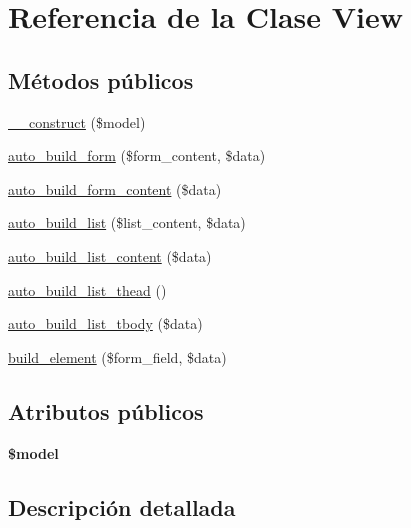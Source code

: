 \hypertarget{class_view}{}\section{Referencia de la Clase View}
\label{class_view}
\subsection*{Métodos públicos}
\begin{DoxyCompactItemize}
\item 
\mbox{\hyperlink{class_view_a946a646ca1bb866acdbde73a28f33993}{\+\_\+\+\_\+construct}} (\$model)
\item 
\mbox{\hyperlink{class_view_a450c3cc299b4e42b3e6499b783a3ad6d}{auto\+\_\+build\+\_\+form}} (\$form\+\_\+content, \$data)
\item 
\mbox{\hyperlink{class_view_a8ab136103e7ca8c850c409e2b7dd92e2}{auto\+\_\+build\+\_\+form\+\_\+content}} (\$data)
\item 
\mbox{\hyperlink{class_view_afff2bf095f5152f4b9074da8c656581f}{auto\+\_\+build\+\_\+list}} (\$list\+\_\+content, \$data)
\item 
\mbox{\hyperlink{class_view_a74d1701b5981346a27394c9b7002cb06}{auto\+\_\+build\+\_\+list\+\_\+content}} (\$data)
\item 
\mbox{\hyperlink{class_view_ac55cd1801295517a7f9fad0d41ddf6d1}{auto\+\_\+build\+\_\+list\+\_\+thead}} ()
\item 
\mbox{\hyperlink{class_view_aaf8b264482d9d19af83177579be7ba3e}{auto\+\_\+build\+\_\+list\+\_\+tbody}} (\$data)
\item 
\mbox{\hyperlink{class_view_ab2f8d0f1c16e7971856e5535d9fc286e}{build\+\_\+element}} (\$form\+\_\+field, \$data)
\end{DoxyCompactItemize}
\subsection*{Atributos públicos}
\begin{DoxyCompactItemize}
\item 
\mbox{\label{class_view_aee47ec7896001294011782441f74e771}} 
{\bfseries \$model}
\end{DoxyCompactItemize}


\subsection{Descripción detallada}


